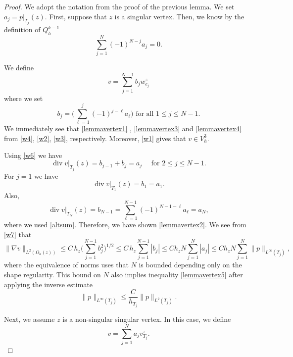 \documentclass[11pt]{amsart}
\numberwithin{equation}{section}
\newcommand{\dive}{\operatorname{div}}
\theoremstyle{definition}
\begin{document}
\begin{proof}
We adopt the notation from  the proof of the previous lemma.  We set $a_j=p|_{T_j}(z)$. First, suppose that $z$ is a singular vertex.  Then, we know by the definition of $Q_h^{k-1}$
\begin{equation}\label{altsum}
\sum_{j=1}^{N} (-1)^{N-j} a_j=0.
\end{equation}



We define 
\begin{equation*}
v=\sum_{j=1}^{N-1}  b_j w_{e_j}^z
\end{equation*}
where  we set
\begin{equation*}
b_{j}=\bigg(\sum_{\ell=1}^{j} (-1)^{j-\ell} a_\ell\bigg) \text{ for all } 1\le j\le N-1.
\end{equation*}
We immediately see that \eqref{lemmavertex1} , \eqref{lemmavertex3} and \eqref{lemmavertex4} from \eqref{w4}, \eqref{w2}, \eqref{w3}, respectively. Moreover, \eqref{w1} gives that $v \in V_h^3$.

Using \eqref{w6} we have 
\begin{equation*}
\dive v|_{T_j}(z)= b_{j-1}+  b_{j}= a_j \quad \text{ for } 2 \le j \le N-1. 
\end{equation*}
For $j =1$ we have 
\begin{equation*}
\dive v|_{T_1}(z)=  b_{1}= a_1. 
\end{equation*}
Also, 
\begin{equation*}
\dive v|_{T_{N}}(z)=  b_{N-1} =  \sum_{\ell=1}^{N-1} (-1)^{N-1-\ell} a_\ell= a_{N},
\end{equation*}
where we used \eqref{altsum}.  Therefore, we have shown \eqref{lemmavertex2}.
We see from \eqref{w7} that 
\begin{equation*}
\|\nabla v\|_{L^2(\Omega_h(z))} \le C \, h_z\bigg(\sum_{j=1}^{N-1} b_j^2\bigg)^{1/2}
\le C \, h_z \sum_{j=1}^{N-1} |b_j| \le C h_z N \sum_{j=1}^{N} |a_j| 
\le C h_z N \sum_{j=1}^{N} \|p\|_{L^\infty(T_j)},
\end{equation*}
where the equivalence of norms uses
that $N$ is bounded depending only on the shape regularity.  
This bound on $N$ also implies
inequality \eqref{lemmavertex5}  after applying the inverse estimate
\begin{equation*}
\|p\|_{L^\infty(T_j)} \le \frac{C}{h_{T_j}} \|p\|_{L^2(T_j)}.
\end{equation*}

Next, we assume $z$ is a non-singular singular vertex.  In this case, we define
\begin{equation*}
v=\sum_{j=1}^{N} a_j v_{T_j}^z.  
\end{equation*}


\end{proof}
\end{document}
